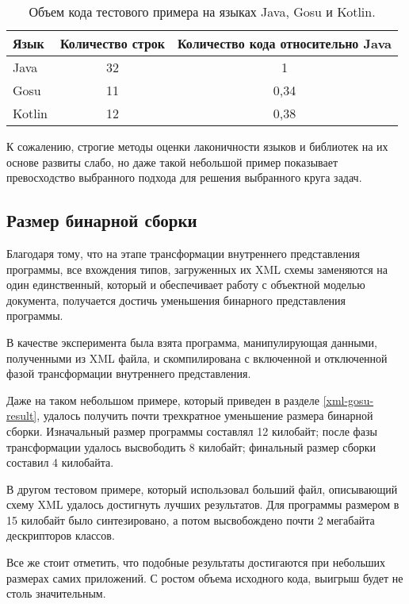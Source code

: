 \begin{table}[!h]\begin{center}
\begin{center}
    \begin{tabular}{ | l | c | c | }
    \hline
    Язык 	& Количество строк & Количество кода относительно Java \\ \hline
    Java 	& 32 	& 1 \\ \hline
    Gosu   	& 11 	& 0,34  \\ \hline
    Kotlin 	& 12 	& 0,38 \\
    \hline
    \end{tabular}
\end{center}
\caption{Объем кода тестового примера на языках Java, Gosu и Kotlin.}
\label{tab:comparation_java_gosu_kotlin}
\end{center}
\end{table}

К сожалению, строгие методы оценки лаконичности языков и библиотек на их основе развиты слабо, но даже такой небольшой пример показывает превосходство выбранного подхода для решения выбранного круга задач.

\subsection{Размер бинарной сборки}
Благодаря тому, что на этапе трансформации внутреннего представления программы, все вхождения типов, загруженных их XML схемы заменяются на один единственный, который и обеспечивает работу с объектной моделью документа, получается достичь уменьшения бинарного представления программы.

В качестве эксперимента была взята программа, манипулирующая данными, полученными из XML файла, и скомпилирована с включенной и отключенной фазой трансформации внутреннего представления.

Даже на таком небольшом примере, который приведен в разделе \ref{xml-gosu-result}, удалось получить почти трехкратное уменьшение размера бинарной сборки. Изначальный размер программы составлял 12 килобайт; после фазы трансформации удалось высвободить 8 килобайт; финальный размер сборки составил 4 килобайта.

В другом тестовом примере, который использовал больший файл, описывающий схему XML удалось достигнуть лучших результатов. Для программы размером в 15 килобайт было синтезировано, а потом высвобождено почти 2 мегабайта дескрипторов классов.

Все же стоит отметить, что подобные результаты достигаются при небольших размерах самих приложений.
С ростом объема исходного кода, выигрыш будет не столь значительным.

